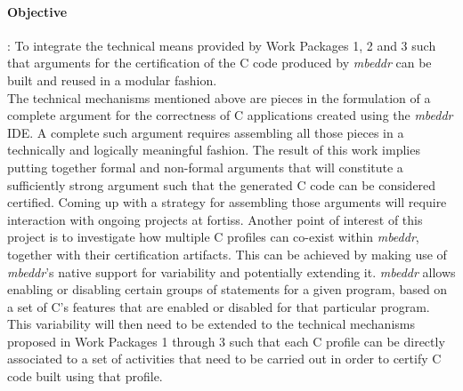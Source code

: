 \paragraph{\textbf{Objective}}: To integrate the technical means provided by
Work Packages 1, 2 and 3 such that arguments for the certification of the C code
produced by \emph{mbeddr} can be built and reused in a modular
fashion.\vspace{.2cm}\\
The technical mechanisms mentioned above are pieces in the formulation of a
complete argument for the correctness of C applications created using the
\emph{mbeddr} IDE.
A complete such argument requires assembling all those pieces in a technically and logically meaningful fashion. The result of
this work implies putting together formal and non-formal arguments that will
constitute a sufficiently strong argument such that the generated C code can be
considered certified.
Coming up with a strategy for assembling those arguments will require
interaction with ongoing projects at fortiss. Another point of interest of
this project is to investigate how multiple C profiles can co-exist within
\emph{mbeddr}, together with their certification artifacts. This can
be achieved by making use of \emph{mbeddr}'s native support for variability and
potentially extending it. \emph{mbeddr} allows enabling or disabling certain
groups of statements for a given program, based on a set of C's features that
are enabled or disabled for that particular program.
This variability will then need to be extended to the technical mechanisms
proposed in Work Packages 1 through 3 such that each C profile can be directly
associated to a set of activities that need to be carried out in order to
certify C code built using that profile.

